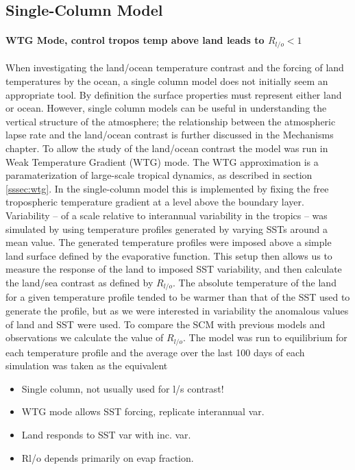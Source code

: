 \subsection{Single-Column Model}

\paragraph{WTG Mode, control tropos temp above land leads to $R_{l/o}<1$}
When investigating the land/ocean temperature contrast and the forcing of land 
temperatures by the ocean, a single column model does not initially seem an 
appropriate tool. By definition the surface properties must represent either 
land or ocean.  However, single column models can be useful in understanding the 
vertical structure of the atmosphere; the relationship between the atmospheric 
lapse rate and the land/ocean contrast is further discussed in the Mechanisms 
chapter. To allow the study of the land/ocean contrast the model was run in Weak 
Temperature Gradient (WTG) mode. The WTG approximation is a paramaterization of 
large-scale tropical dynamics, as described in section \ref{sssec:wtg}. In the 
single-column model this is implemented by fixing the free tropospheric 
temperature gradient at a level above the boundary layer. Variability -- of a 
scale relative to interannual variability in the tropics -- was simulated by 
using temperature profiles generated by varying SSTs around a mean value. The 
generated temperature profiles were imposed above a simple land surface defined 
by the evaporative function. This setup then allows us to measure the response 
of the land to imposed SST variability, and then calculate the land/sea contrast 
as defined by $R_{l/o}$. The absolute temperature of the land for a given 
temperature profile tended to be warmer than that of the SST used to generate 
the profile, but as we were interested in variability the anomalous values of 
land and SST were used. To compare the SCM with previous models and observations 
we calculate the value of $R_{l/o}$. The model was run to equilibrium for each 
temperature profile and the average over the last 100 days of each simulation 
was taken as the equivalent


\begin{itemize}
	\item Single column, not usually used for l/s contrast!
	\item WTG mode allows SST forcing, replicate interannual var.
	\item Land responds to SST var with inc. var.
	\item Rl/o depends primarily on evap fraction.
\end{itemize}

